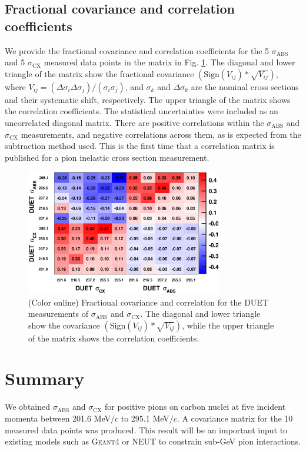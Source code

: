 \subsection{Fractional covariance and correlation coefficients}
We provide the fractional covariance and correlation coefficients for the 5 $\sigma_{\mathrm{ABS}}$ and 5 $\sigma_{\mathrm{CX}}$ measured data points in the matrix in Fig. \ref{fig:covariance}. The diagonal and lower triangle of the matrix show the fractional covariance $(\mathrm{Sign}(V_{ij})*\sqrt{V_{ij}})$, where $V_{ij} = (\Delta\sigma_{i}\Delta\sigma_{j})/(\sigma_{i}\sigma_{j})$, and $\sigma_{k}$ and $\Delta\sigma_{k}$ are the nominal cross sections and their systematic shift, respectively. The upper triangle of the matrix shows the correlation coefficients.
The statistical uncertainties were included as an uncorrelated diagonal matrix. There are positive correlations within the $\sigma_{\mathrm{ABS}}$ and $\sigma_{\mathrm{CX}}$ measurements, and negative correlations across them, as is expected from the subtraction method used. This is the first time that a correlation matrix is published for a pion inelastic cross section measurement.

\begin{figure}[h]
\begin{center}
\includegraphics[width=86mm]{figures/duet_fractional_covariance_forpaper_v4.eps}
\caption{(Color online) Fractional covariance and correlation for the DUET measurements of $\sigma_{\mathrm{ABS}}$ and $\sigma_{\mathrm{CX}}$. The  diagonal and lower triangle show the covariance $(\mathrm{Sign}(V_{ij})*\sqrt{V_{ij}})$, while the upper triangle of the matrix shows the correlation coefficients.}
\label{fig:covariance}
\end{center} 
\end{figure}

\section{Summary}
We obtained $\sigma_{\mathrm{ABS}}$ and $\sigma_{\mathrm{CX}}$ for positive pions on carbon nuclei at five incident momenta between 201.6 MeV$/c$ to 295.1 MeV$/c$. A covariance matrix for the 10 measured data points was produced. This result will be an important input to existing models such as \textsc{Geant4} or \textsc{NEUT} to constrain sub-GeV pion interactions.
